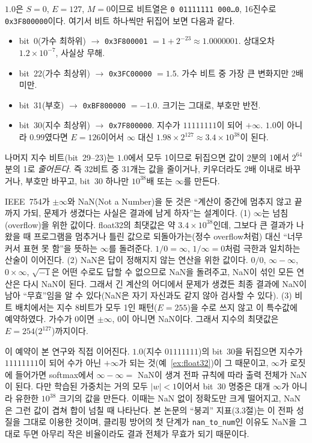 \documentclass[11pt,a4paper]{article}
\newcommand{\code}[1]{\texttt{#1}}
\newcounter{note}
\newcounter{example}
\begin{document}
\begin{example}
\label{ex:float32}
$1.0$은 $S=0$, $E=127$, $M=0$이므로 비트열은 \code{0 01111111 000\ldots0}, 16진수로 \code{0x3F800000}이다. 여기서 비트 하나씩만 뒤집어 보면 다음과 같다.
\begin{itemize}[nosep,leftmargin=1.6em]
  \item bit~0(가수 최하위) $\to$ \code{0x3F800001} $= 1+2^{-23}\approx1.0000001$. 상대오차 $1.2\times10^{-7}$, 사실상 무해.
  \item bit~22(가수 최상위) $\to$ \code{0x3FC00000} $= 1.5$. 가수 비트 중 가장 큰 변화지만 2배 미만.
  \item bit~31(부호) $\to$ \code{0xBF800000} $= -1.0$. 크기는 그대로, 부호만 반전.
  \item bit~30(지수 최상위) $\to$ \code{0x7F800000}. 지수가 $11111111$이 되어 $+\infty$. $1.0$이 아니라 $0.99$였다면 $E=126$이어서 $\infty$ 대신 $1.98\times2^{127}\approx3.4\times10^{38}$이 된다.
\end{itemize}
나머지 지수 비트(bit~29--23)는 $1.0$에서 모두 1이므로 뒤집으면 값이 2분의 1에서 $2^{64}$분의 1로 \emph{줄어든다}. 즉 32비트 중 31개는 값을 줄이거나, 키우더라도 2배 이내로 바꾸거나, 부호만 바꾸고, bit~30 하나만 $10^{38}$배 또는 $\infty$를 만든다.
\end{example}

\begin{note}
\label{note:nan}
IEEE~754가 $\pm\infty$와 NaN(Not a Number)을 둔 것은 ``계산이 중간에 멈추지 않고 끝까지 가되, 문제가 생겼다는 사실은 결과에 남게 하자''는 설계이다. (1) $\infty$는 넘침(overflow)을 위한 값이다. float32의 최댓값은 약 $3.4\times10^{38}$인데, 그보다 큰 결과가 나왔을 때 프로그램을 멈추거나 틀린 값으로 되돌아가는(정수 overflow처럼) 대신 ``너무 커서 표현 못 함''을 뜻하는 $\infty$를 돌려준다. $1/0=\infty$, $1/\infty=0$처럼 극한과 일치하는 산술이 이어진다. (2) NaN은 답이 정해지지 않는 연산을 위한 값이다. $0/0$, $\infty-\infty$, $0\times\infty$, $\sqrt{-1}$은 어떤 수로도 답할 수 없으므로 NaN을 돌려주고, NaN이 섞인 모든 연산은 다시 NaN이 된다. 그래서 긴 계산의 어디에서 문제가 생겼든 최종 결과에 NaN이 남아 ``무효''임을 알 수 있다(NaN은 자기 자신과도 같지 않아 검사할 수 있다). (3) 비트 배치에서는 지수 8비트가 모두 1인 패턴($E=255$)을 수로 쓰지 않고 이 특수값에 예약하였다. 가수가 0이면 $\pm\infty$, 0이 아니면 NaN이다. 그래서 지수의 최댓값은 $E=254$($2^{127}$)까지이다.

이 예약이 본 연구와 직접 이어진다. $1.0$(지수 $01111111$)의 bit~30을 뒤집으면 지수가 $11111111$이 되어 수가 아닌 $+\infty$가 되는 것(예~\ref{ex:float32})이 그 때문이고, $\infty$가 로짓에 들어가면 softmax에서 $\infty-\infty=$ NaN이 생겨 전파 규칙에 따라 출력 전체가 NaN이 된다. 다만 학습된 가중치는 거의 모두 $|w|<1$이어서 bit~30 명중은 대개 $\infty$가 아니라 유한한 $10^{38}$ 크기의 값을 만든다. 이때는 NaN 없이 정확도만 크게 떨어지고, NaN은 그런 값이 겹쳐 합이 넘칠 때 나타난다. 본 논문의 ``붕괴'' 지표(3.3절)는 이 전파 성질을 그대로 이용한 것이며, 클리핑 방어의 첫 단계가 \code{nan\_to\_num}인 이유도 NaN을 그대로 두면 아무리 작은 비율이라도 결과 전체가 무효가 되기 때문이다.
\end{note}
\end{document}
